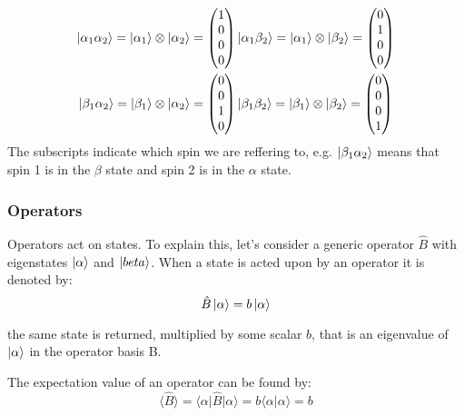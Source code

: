 \begin{align}\label{eqn:2spinstates}
\ket{\alpha_{1}\alpha_{2}} = \ket{\alpha_1} \otimes \ket{\alpha_2} = \begin{pmatrix}
  1\\
  0\\
  0\\
  0
\end{pmatrix} &
\ket{\alpha_{1}\beta_{2}} = \ket{\alpha_1} \otimes \ket{\beta_2} = \begin{pmatrix}
  0\\
  1\\
  0\\
  0
\end{pmatrix}\\
\ket{\beta_{1}\alpha_{2}} = \ket{\beta_1} \otimes \ket{\alpha_2} = \begin{pmatrix}
  0\\
  0\\
  1\\
  0
\end{pmatrix} &
\ket{\beta_{1}\beta_{2}} = \ket{\beta_1} \otimes \ket{\beta_2} = \begin{pmatrix}
  0\\
  0\\
  0\\
  1
\end{pmatrix}
\end{align}
The subscripts indicate which spin we are reffering to, e.g. $\ket{\beta_1\alpha_2}$ means that
spin 1 is in the $\beta$ state and spin 2 is in the $\alpha$ state.

\subsubsection{Operators}

Operators act on states. To explain this, let's consider a generic operator $\hat{B}$ with eigenstates $\ket{\alpha}$ and $\ket{beta}$. When a state is acted upon by an operator it is denoted by:
\begin{equation}
  \hat{B}\ket{\alpha} = b\ket{\alpha}
\end{equation}

the same state is returned, multiplied by some scalar $b$, that is an eigenvalue of $\ket{\alpha}$
in the operator basis B.

The expectation value of an operator can be found by:
\begin{equation}\label{eqn:expectation}
  \langle\hat{B}\rangle = \langle\alpha\vert\hat{B}\vert\alpha\rangle = b\langle\alpha\vert\alpha\rangle = b
\end{equation}

